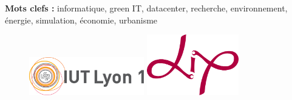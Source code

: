 \begin{spacing}{1}
	\textbf{Mots clefs :} informatique, green IT, datacenter, recherche, environnement, énergie, simulation, économie, urbanisme\\
	
	\begin{figure}[b]
		\begin{minipage}[c]{.48\linewidth}
			\center
			\includegraphics[width=5cm]{pagedegarde/images/logo_iut.png}
		\end{minipage} \hfill
		\begin{minipage}[c]{.48\linewidth}
			\center
			\includegraphics[width=4cm]{pagedegarde/images/logo_lip.png}
		\end{minipage}
	\end{figure}
\end{spacing}